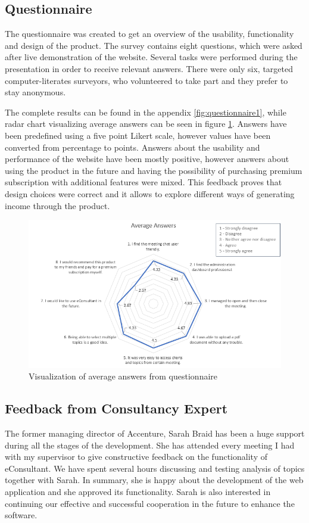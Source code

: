\documentclass{article}
\begin{document}
\subsection{Questionnaire}
{\large 
The questionnaire was created to get an overview of the usability, functionality and design of the product. The survey contains eight questions, which were asked after live demonstration of the website. Several tasks were performed during the presentation in order to receive relevant answers. There were only six, targeted computer-literates surveyors, who volunteered to take part and they prefer to stay anonymous.\par

The complete results can be found in the appendix \ref{fig:questionnaire1}, while radar chart visualizing average answers can be seen in figure \ref{fig:questionnaireChart}. Answers have been predefined using a five point Likert scale, however values have been converted from percentage to points. Answers about the usability and performance of the website have been mostly positive, however answers about using the product in the future and having the possibility of purchasing premium subscription with additional features were mixed. This feedback proves that design choices were correct and it allows to explore different ways of generating income through the product.\par
}

\begin{figure}[H]
  \centering
  \includegraphics[scale=0.76]{implementation/questionnaireChart.png}
  \caption{Visualization of average answers from questionnaire}
  \label{fig:questionnaireChart}
\end{figure}

\subsection{Feedback from Consultancy Expert}
{\large 
The former managing director of Accenture, Sarah Braid has been a huge support during all the stages of the development. She has attended every meeting I had with my supervisor to give constructive feedback on the functionality of eConsultant. We have spent several hours discussing and testing analysis of topics together with Sarah. In summary, she is happy about the development of the web application and she approved its functionality. Sarah is also interested in continuing our effective and successful cooperation in the future to enhance the software.\par
}
\end{document}

